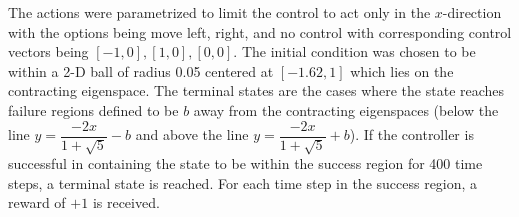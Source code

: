 \documentclass{article}
\begin{document}
The actions were parametrized to limit the control to act only in the $x$-direction with the options being move left, right, and no control with corresponding control vectors being $[-1, 0], [1, 0], [0,0]$. The initial condition was chosen to be within a 2-D ball of radius 0.05 centered at $[-1.62, 1]$ which lies on the contracting eigenspace. The terminal states are the cases where the state reaches failure regions defined to be $b$ away from the contracting eigenspaces (below the line $y = \dfrac{-2x}{1+\sqrt{5}} - b$ and above the line $y = \dfrac{-2x}{1+\sqrt{5}} + b$). If the controller is successful in containing the state to be within the success region for 400 time steps, a terminal state is reached. For each time step in the success region, a reward of $+1$ is received. 



 

\end{document}
